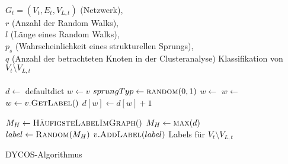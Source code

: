 \begin{algorithm}
    \begin{algorithmic}[1]
        \Require \\$G_t = (V_t, E_t, V_{L,t})$ (Netzwerk),\\
                 $r$ (Anzahl der Random Walks),\\
                 $l$ (Länge eines Random Walks),\\
                 $p_s$ (Wahrscheinlichkeit eines strukturellen Sprungs),\\
                 $q$ (Anzahl der betrachteten Knoten in der Clusteranalyse)
        \Ensure  Klassifikation von $V_t \setminus V_{L,t}$\\
        \\

            \State $d \gets $ defaultdict
                \State $w \gets v$
                    \State $sprungTyp \gets \Call{random}{0, 1}$
                        \State $w \gets$ 
                    \Else
                        \State $w \gets$ 
                    \EndIf
                    \State $w \gets v.\Call{GetLabel}{ }$ 
                    \State $d[w] \gets d[w] + 1$
                \EndFor
            \EndFor

             
                \State $M_H \gets \Call{HäufigsteLabelImGraph}{ }$
            \Else
                \State $M_H \gets \Call{max}{d}$
            \EndIf
            \\
            \State {}
            \State $label \gets \Call{Random}{M_H}$ 
            \State $v.\Call{AddLabel}{label}$ 
        \EndFor
        \State \Return Labels für $V_t \setminus V_{L,t}$
    \end{algorithmic}
\caption{DYCOS-Algorithmus}
\label{alg:DYCOS}
\end{algorithm}
